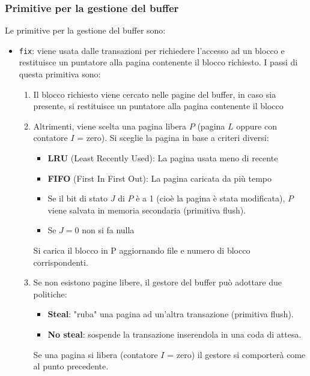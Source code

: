 \documentclass[a4paper]{article}
\begin{document}
\subsubsection{Primitive per la gestione del buffer}
Le primitive per la gestione del buffer sono:
\begin{itemize}
  \item \texttt{fix}: viene usata dalle transazioni per richiedere l'accesso ad un
    blocco e restituisce un puntatore alla pagina contenente il blocco richiesto.
    I passi di questa primitiva sono:
    \begin{enumerate}
      \item Il blocco richiesto viene cercato nelle pagine del buffer, in caso sia
        presente, si restituisce un puntatore alla pagina contenente il blocco

      \item Altrimenti, viene scelta una pagina libera \( P \) (pagina \( L \) oppure
        con contatore \( I \) = zero). Si sceglie la pagina in base a criteri diversi:
        \begin{itemize}
          \item \textbf{LRU} (Least Recently Used): La pagina usata meno di recente
          \item \textbf{FIFO} (First In First Out): La pagina caricata da più tempo
        \end{itemize}
        \begin{itemize}
          \item 
            Se il bit di stato \( J \) di \( P \) è a 1 (cioè la pagina è stata modificata),
            \( P \) viene salvata in memoria secondaria (primitiva flush).

          \item Se \( J = 0 \) non si fa nulla
        \end{itemize}
            Si carica il blocco in P aggiornando file e numero di blocco corrispondenti.
            
      \item Se non esistono pagine libere, il gestore del buffer può adottare due
        politiche:
        \begin{itemize}
          \item \textbf{Steal}: "ruba" una pagina ad un’altra transazione
            (primitiva flush).
          \item \textbf{No steal}: sospende la transazione inserendola in una coda di
            attesa.
        \end{itemize}
        Se una pagina si libera (contatore \( I \) = zero) il gestore si comporterà
        come al punto precedente.


\end{enumerate}
\end{itemize}
\end{document}
